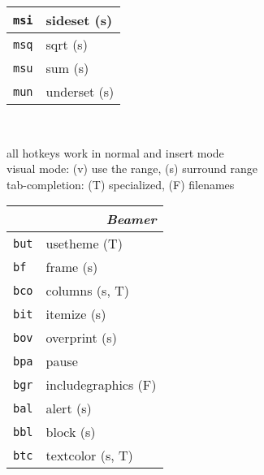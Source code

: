 \documentclass[oneside,10pt,landscape,DIV16]{scrartcl}
\newcommand{\Map}[1] {\textbf{\textasciiacute}\texttt{#1}}
\begin{document}
\begin{multicols}{3}
\begin{center}
\begin{tabular}[]{|p{11mm}|p{62mm}|}
\hline  \Map{msi} & sideset                   \hfill (s)\\
\hline  \Map{msq} & sqrt                      \hfill (s)\\
\hline  \Map{msu} & sum                       \hfill (s)\\
\hline  \Map{mun} & underset                  \hfill (s)\\
\hline
%
\end{tabular}\\[1.0ex]
%
\begin{minipage}[b]{72mm}%
\scriptsize{%
all hotkeys work in normal and insert mode \\
visual mode: {\normalsize (v)} use the range,
{\normalsize (s)} surround range \\
tab-completion: {\normalsize (T)} specialized,
{\normalsize (F)} filenames
}%
\end{minipage}
%
\newpage
%
\begin{tabular}[]{|p{11mm}|p{60mm}|}
\hline
\multicolumn{2}{|r|}{\textsl{B\textbf{e}amer}}\\[1.0ex]
\hline \Map{but} & usetheme        \hfill (T)\\
\hline \Map{bf}  & frame           \hfill (s)\\
\hline \Map{bco} & columns         \hfill (s, T)\\
\hline \Map{bit} & itemize         \hfill (s)\\
\hline \Map{bov} & overprint       \hfill (s)\\
\hline \Map{bpa} & pause           \\
\hline \Map{bgr} & includegraphics \hfill (F)\\
\hline \Map{bal} & alert           \hfill (s)\\
\hline \Map{bbl} & block           \hfill (s)\\
\hline \Map{btc} & textcolor       \hfill (s, T)\\
\hline

\end{tabular}
\end{center}
\end{multicols}
\end{document}
